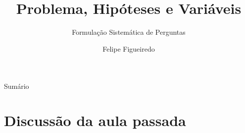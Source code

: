 \documentclass{beamer}
\title%
{Problema, Hipóteses e Variáveis}
\subtitle
{Formulação Sistemática de Perguntas} %
\author%
{Felipe Figueiredo}%
\institute[INTO] %
{Instituto Nacional de Traumatologia e Ortopedia
}
\date%
{}
\begin{document}
\begin{frame}
  \titlepage
\end{frame}

\begin{frame}{Sumário}
  \tableofcontents
\end{frame}








\section{Discussão da aula passada}
\end{document}
